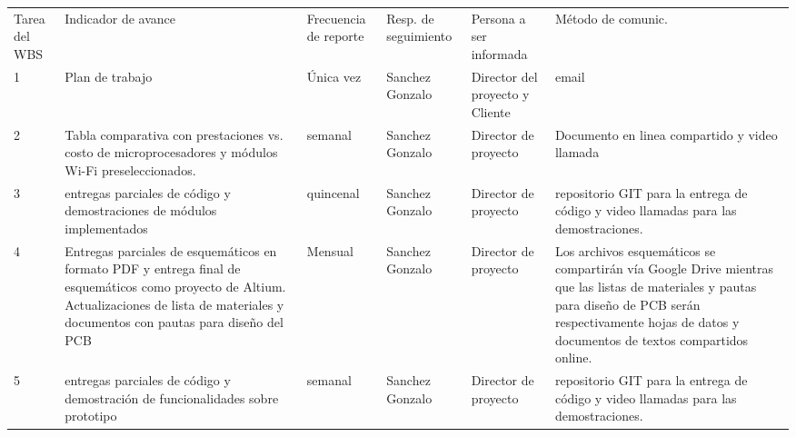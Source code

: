 \documentclass[11pt]{charter}
\begin{document}
\begin{table}[!htpb]
\centering
\begin{tabularx}{\linewidth}{@{}|X|C{2.5cm}|C{3cm}|C{2cm}|C{2cm}|C{2.5cm}|@{}}
\hline
{} 
                                                                       \\ \hline
{} 
Tarea del WBS & Indicador de avance & Frecuencia de reporte & Resp. de seguimiento & Persona a ser informada & Método de comunic. \\ \hline

1 &
Plan de trabajo  &  
Única vez  &  
Sanchez Gonzalo  &  
Director del proyecto y Cliente  &
email    \\ \hline
 
2 &
Tabla comparativa con prestaciones vs. costo de microprocesadores y módulos Wi-Fi preseleccionados.  &  
semanal  &  
Sanchez Gonzalo  &  
Director de proyecto  &
Documento en linea compartido y video llamada    \\ \hline
    
3 &
entregas parciales de código y demostraciones de módulos implementados  &  
quincenal  &  
Sanchez Gonzalo  &  
Director de proyecto  &
repositorio GIT para la entrega de código y video llamadas para las demostraciones.    \\ \hline
    
4 &
Entregas parciales de esquemáticos en formato PDF y entrega final de esquemáticos como proyecto de Altium. Actualizaciones de lista de materiales y documentos con pautas para diseño del PCB  &  
Mensual  &  
Sanchez Gonzalo  &  
Director de proyecto  &
Los archivos esquemáticos se compartirán vía Google Drive mientras que las listas de materiales y pautas para diseño de PCB serán respectivamente hojas de datos y documentos de textos compartidos online.   \\ \hline

5 &
entregas parciales de código y demostración de funcionalidades sobre prototipo   &  
semanal  &  
Sanchez Gonzalo  &  
Director de proyecto  &
repositorio GIT para la entrega de código y video llamadas para las demostraciones.    \\ \hline

\end{tabularx}%
\end{table}
\end{document}
